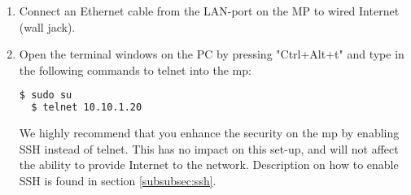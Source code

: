 \begin{enumerate}
\begin{enumerate}
\item In the field BSSID enter "02:CA:FF:EE:BA:BE", like shown in .
\item Under the tab "IPv4 Settings" choose "Manual" in the "Method" drop-down menu, like shown in . 
\item Then press "Add" on the same page. Enter the following parameters, like shown in :
\begin{description}
\item[] \textbf{Address:} 10.10.1.245
\item[] \textbf{Netmask:} 24
\item[] \textbf{Gateway:} 10.130.1.1
\end{description}
\begin{figure}[h!]
        \centering
        \begin{subfigure}[t]{0.49\textwidth}
                \texttt{[image: bssid.PNG]}
                \caption{\textbf{The correct BSSID set.}}\label{fig:bssid}
        \end{subfigure}
        \begin{subfigure}[t]{0.49\textwidth}
                \texttt{[image: ipv4settings.PNG]}
                \caption{\textbf{The correct parameters set under IPv4 settings.}}\label{fig:ipv4settings}
        \end{subfigure}
\caption{"Edit Connections" settings on Linux}
\end{figure}
\item Press "Save" on the "Editing vt-mesh"-window, and then "Close" on the "Network Connections"-window. 
\item Then choose "vt-mesh" from the list of available networks. This list is found after pressing the WiFi symbol in the top right corner on your screen. The PC should then be connected to the MP via WiFi. 
\end{enumerate}
\item Connect an Ethernet cable from the LAN-port on the MP to wired Internet (wall jack).
\item Open the terminal windows on the PC by pressing "Ctrl+Alt+t" and type in the following commands to telnet into the \gls{mp}:
\noindent
\begin{lstlisting}[language=bash]
  $ sudo su
  $ telnet 10.10.1.20
\end{lstlisting}
We highly recommend that you enhance the security on the \gls{mp} by enabling SSH instead of telnet. This has no impact on this set-up, and will not affect the ability to provide Internet to the network. Description on how to enable SSH is found in section \ref{subsubsec:ssh}.

\end{enumerate}
